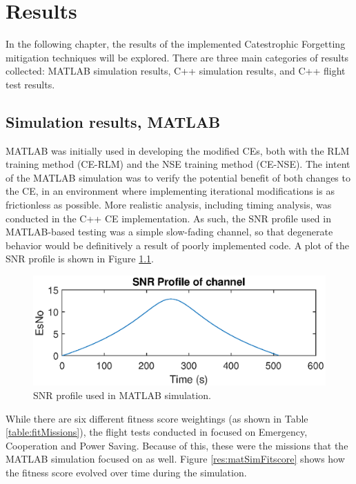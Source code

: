 \chapter{Results}\label{ch:results}

\par In the following chapter, the results of the implemented Catestrophic Forgetting mitigation techniques will be explored. There are three main categories of results collected: MATLAB simulation results, C++ simulation results, and C++ flight test results.
\section{Simulation results, MATLAB}
\par MATLAB was initially used in developing the modified CEs, both with the RLM training method (CE-RLM) and the NSE training method (CE-NSE). The intent of the MATLAB simulation was to verify the potential benefit of both changes to the CE, in an environment where implementing iterational modifications is as frictionless as possible. More realistic analysis, including timing analysis, was conducted in the C++ CE implementation. As such, the SNR profile used in MATLAB-based testing was a simple slow-fading channel, so that degenerate behavior would be definitively a result of poorly implemented code. A plot of the SNR profile is shown in Figure \ref{fig:matlabSNRProf}. 

\begin{figure}[ht]
\centering
\includegraphics[scale=1]{figures/matlab_sim_results/snrPRofile_matlabsim.eps}
\caption{SNR profile used in MATLAB simulation.}
\label{fig:matlabSNRProf}
\end{figure}

\par While there are six different fitness score weightings (as shown in Table \ref{table:fitMissions}), the flight tests conducted in \cite{tim_implementation} focused on Emergency, Cooperation and Power Saving. Because of this, these were the missions that the MATLAB simulation focused on as well. Figure \ref{res:matSimFitscore} shows how the fitness score evolved over time during the simulation.

